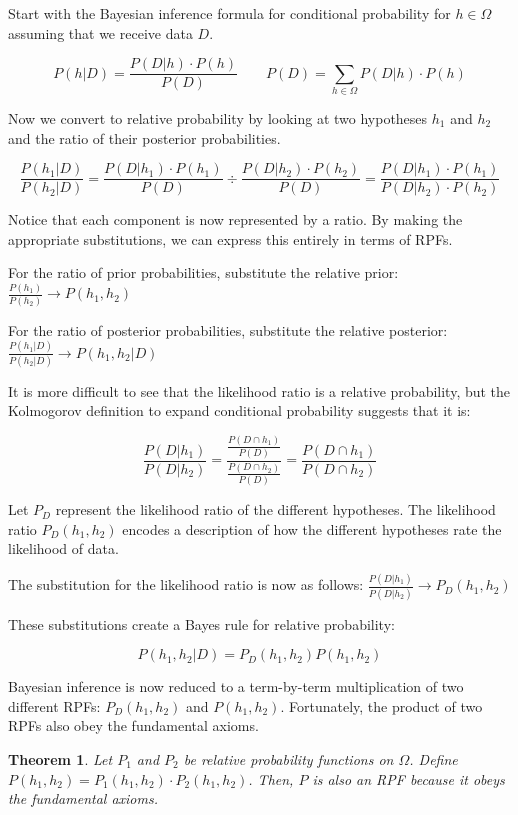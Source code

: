 \documentclass[twoside]{article}
\theoremstyle{plain}%
\newtheorem{theorem}{Theorem}[section]
\theoremstyle{definition}
\theoremstyle{remark}
\begin{document}
Start with the Bayesian inference formula for conditional probability for \(h \in \Omega\) assuming that we receive data \(D\).

\[P(h|D) = \frac{P(D|h) \cdot P(h)}{P(D)} \qquad P(D) = \sum_{h \in \Omega} P(D|h) \cdot P(h)\]

Now we convert to relative probability by looking at two hypotheses \(h_1\) and \(h_2\) and the ratio of their posterior probabilities.

\[\frac{P(h_1|D)}{P(h_2| D)} = \frac{P(D|h_1) \cdot P(h_1)}{P(D)} \div \frac{P(D|h_2) \cdot P(h_2)}{P(D)} = \frac{P(D|h_1) \cdot P(h_1)}{P(D|h_2) \cdot P(h_2)} \]

Notice that each component is now represented by a ratio. By making the appropriate substitutions, we can express this entirely in terms of RPFs.

For the ratio of prior probabilities, substitute the relative prior: \(\frac{P(h_1)}{P(h_2)} \rightarrow P(h_1, h_2) \)

For the ratio of posterior probabilities, substitute the relative posterior: \(\frac{P(h_1|D)}{P(h_2|D)} \rightarrow P(h_1, h_2|D) \)

It is more difficult to see that the likelihood ratio is a relative probability, but the Kolmogorov definition to expand conditional probability suggests that it is:

\[\frac{P(D|h_1)}{P(D|h_2)} = \frac{\frac{P(D \cap h_1)}{P(D)}}{\frac{P(D \cap h_2)}{P(D)}} = \frac{P(D \cap h_1)}{P(D \cap h_2)} \]

Let \(P_D\) represent the likelihood ratio of the different hypotheses. The likelihood ratio \(P_D(h_1, h_2)\) encodes a description of how the different hypotheses rate the likelihood of data.

The substitution for the likelihood ratio is now as follows: \(\frac{P(D|h_1)}{P(D|h_2)} \rightarrow P_D(h_1, h_2) \)

These substitutions create a Bayes rule for relative probability:

\begin{equation}
P(h_1, h_2|D) = P_D(h_1, h_2) P(h_1, h_2)
\end{equation}
 
Bayesian inference is now reduced to a term-by-term multiplication of two different RPFs: \(P_D(h_1, h_2)\) and \(P(h_1, h_2)\). Fortunately, the product of two RPFs also obey the fundamental axioms.

\begin{theorem} 
Let \(P_1\) and \(P_2\) be relative probability functions on \(\Omega\). Define \(P(h_1, h_2) = P_1(h_1, h_2) \cdot P_2(h_1, h_2)\). Then, \(P\) is also an RPF because it obeys the fundamental axioms.
\end{theorem}
\end{document}
